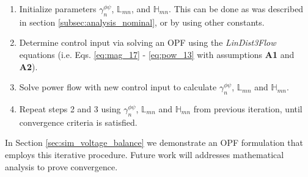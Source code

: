 \begin{enumerate}
\item Initialize parameters $\gamma_{n}^{\phi \psi}$, $\mathbb{L}_{mn}$, and $\mathbb{H}_{mn}$.  This can be done as was described in section \ref{subsec:analysis_nominal}, or by using other constants.
\item Determine control input via solving an OPF using the \emph{LinDist3Flow} equations (i.e. Eqs. \eqref{eq:mag_17} - \eqref{eq:pow_13} with assumptions \textbf{A1} and \textbf{A2}).
\item Solve power flow with new control input to calculate $\gamma_{n}^{\phi \psi}$, $\mathbb{L}_{mn}$ and $\mathbb{H}_{mn}$.
\item Repeat steps 2 and 3 using $\gamma_{n}^{\phi \psi}$, $\mathbb{L}_{mn}$ and $\mathbb{H}_{mn}$ from previous iteration, until convergence criteria is satisfied.
\end{enumerate}

In Section \ref{sec:sim_voltage_balance} we demonstrate an OPF formulation that employs this iterative procedure. Future work will addresses mathematical analysis to prove convergence.


